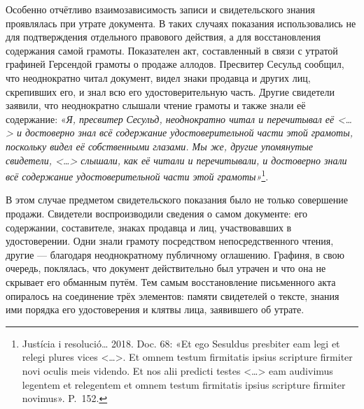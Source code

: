 Особенно отчётливо взаимозависимость записи и свидетельского знания проявлялась при утрате документа. В таких случаях показания использовались не для подтверждения отдельного правового действия, а для восстановления содержания самой грамоты. Показателен акт, составленный в связи с утратой графиней Герсендой грамоты о продаже аллодов. Пресвитер Сесульд сообщил, что неоднократно читал документ, видел знаки продавца и других лиц, скрепивших его, и знал всю его удостоверительную часть. Другие свидетели заявили, что неоднократно слышали чтение грамоты и также знали её содержание: «\emph{Я, пресвитер }\emph{Сесульд}\emph{, неоднократно читал и перечитывал её <…> и достоверно знал всё содержание удостоверительной части этой грамоты, поскольку видел её собственными глазами. Мы же, другие упомянутые свидетели, <…> слышали, как её читали и перечитывали, и достоверно знали всё содержание удостоверительной части этой грамоты»}\footnote{Justícia i resolució… 2018. Doc. 68: «Et ego Sesuldus presbiter eam legi et relegi plures vices <…>. Et omnem testum firmitatis ipsius scripture firmiter novi oculis meis videndo. Et nos alii predicti testes <…> eam audivimus legentem et relegentem et omnem testum firmitatis ipsius scripture firmiter novimus». P.~152.}.

В этом случае предметом свидетельского показания было не только совершение продажи. Свидетели воспроизводили сведения о самом документе: его содержании, составителе, знаках продавца и лиц, участвовавших в удостоверении. Одни знали грамоту посредством непосредственного чтения, другие --- благодаря неоднократному публичному оглашению. Графиня, в свою очередь, поклялась, что документ действительно был утрачен и что она не скрывает его обманным путём. Тем самым восстановление письменного акта опиралось на соединение трёх элементов: памяти свидетелей о тексте, знания ими порядка его удостоверения и клятвы лица, заявившего об утрате.

